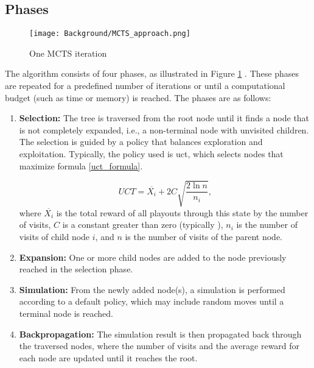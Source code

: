 \subsection{Phases}

\begin{figure}
      \centering
      \texttt{[image: Background/MCTS\_approach.png]}
      \caption[MCTS approach]
      {One MCTS iteration \cite{browne_survey_2012}}
      \label{fig:mcts_approach}
\end{figure}

The algorithm consists of four phases, as illustrated in Figure \ref{fig:mcts_approach}  \cite{browne_survey_2012}. These phases are repeated for a predefined number of iterations or until a computational budget (such as time or memory) is reached. The phases are as follows:

\begin{enumerate}
	\item \textbf{Selection:} The tree is traversed from the root node until it finds a node that is not completely expanded, i.e., a non-terminal node with unvisited children. The selection is guided by a policy that balances exploration and exploitation. Typically, the policy used is \ac{uct}, which selects nodes that maximize formula \ref{uct_formula}.
	 
	\begin{equation}
	UCT = \overline{X_i} + 2C\sqrt{\frac{2\ln{n}}{n_i}},\label{uct_formula}
	\end{equation} where \(\overline{X_i}\) is the total reward of all playouts through this state by the number of visits, \(C\) is a constant greater than zero (typically ), \(n_i\) is the number of visits of child node \(i\), and \(n\) is the number of visits of the parent node.
    \item \textbf{Expansion:} One or more child nodes are added to the node previously reached in the selection phase.
    \item \textbf{Simulation:} From the newly added node(s), a simulation is performed according to a default policy, which may include random moves until a terminal node is reached.
    \item \textbf{Backpropagation:} The simulation result is then propagated back through the traversed nodes, where the number of visits and the average reward for each node are updated until it reaches the root.
\end{enumerate}


